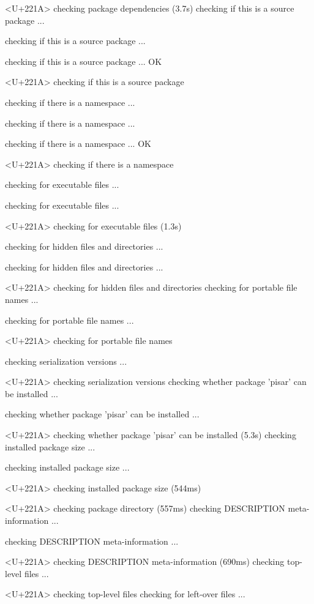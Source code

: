 \documentclass[a4paper,12pt]{article}\usepackage[]{graphicx}\usepackage[]{color}
\begin{document}
\begin{Schunk}
\begin{Soutput}
<U+221A>  checking package dependencies (3.7s)
   checking if this is a source package ...
  
   checking if this is a source package ... 
  
   checking if this is a source package ... OK
  
<U+221A>  checking if this is a source package

  
   checking if there is a namespace ...
  
   checking if there is a namespace ... 
  
   checking if there is a namespace ... OK
  
<U+221A>  checking if there is a namespace

  
  
  
   checking for executable files ...
  
   checking for executable files ... 
  
<U+221A>  checking for executable files (1.3s)

  
   checking for hidden files and directories ...
  
   checking for hidden files and directories ... 
  
<U+221A>  checking for hidden files and directories
   checking for portable file names ...
  
   checking for portable file names ... 
  
<U+221A>  checking for portable file names

  
   checking serialization versions ...
  
<U+221A>  checking serialization versions
   checking whether package 'pisar' can be installed ...
  
   checking whether package 'pisar' can be installed ... 
  
<U+221A>  checking whether package 'pisar' can be installed (5.3s)
   checking installed package size ...
  
   checking installed package size ... 
  
<U+221A>  checking installed package size (544ms)

  
  
  
<U+221A>  checking package directory (557ms)
   checking DESCRIPTION meta-information ...
  
   checking DESCRIPTION meta-information ... 
  
<U+221A>  checking DESCRIPTION meta-information (690ms)
   checking top-level files ...
  
<U+221A>  checking top-level files
   checking for left-over files ...
  

\end{Soutput}
\end{Schunk}
\end{document}
